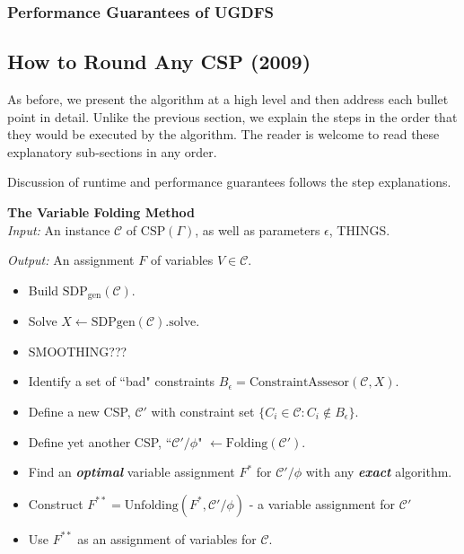 \subsubsection{Performance Guarantees of UGDFS}

\subsection{How to Round Any CSP (2009)}
As before, we present the algorithm at a high level and then address each bullet point in detail. Unlike the previous section, we explain the steps in the order that they would be executed by the algorithm. The reader is welcome to read these explanatory sub-sections in any order. 

Discussion of runtime and performance guarantees follows the step explanations.


\begin{algorithm} \textbf{The Variable Folding Method} \\

\textit{Input: } An instance $\mathcal{C}$ of $\text{CSP}(\Gamma)$, as well as parameters $\epsilon$, THINGS.

\textit{Output: } An assignment $F$ of variables $V \in \mathcal{C}$.
\begin{itemize}
\item Build $\text{SDP}_{\text{gen}}(\mathcal{C})$.
\item Solve $X \leftarrow \text{SDPgen}(\mathcal{C}).\text{solve}$.
\item SMOOTHING???
\item Identify a set of ``bad" constraints $B_{\epsilon} = \text{ConstraintAssesor}(\mathcal{C},X)$.
\item Define a new CSP, $\mathcal{C}'$ with constraint set $\{C_i \in \mathcal{C} : C_i \not \in B_{\epsilon}\}$.
\item Define yet another CSP, ``$\mathcal{C}'/\phi$" $ \leftarrow \text{Folding}(\mathcal{C}')$.
\item Find an \textit{\textbf{optimal}} variable assignment $F^*$ for $\mathcal{C}'/\phi$ with any \textit{\textbf{exact}} algorithm.
\item Construct $F^{**} = \text{Unfolding}(F^*, \mathcal{C}'/\phi)$ - a variable assignment for $\mathcal{C}'$
\item Use $F^{**}$ as an assignment of variables for $\mathcal{C}$.
\end{itemize}
\end{algorithm}

